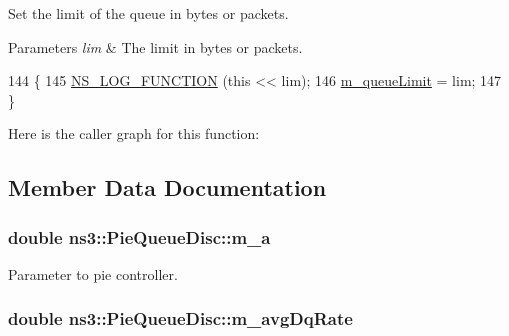 Set the limit of the queue in bytes or packets. 


\begin{DoxyParams}{Parameters}
{\em lim} & The limit in bytes or packets. \\
\hline
\end{DoxyParams}

\begin{DoxyCode}
144 \{
145   \hyperlink{log-macros-disabled_8h_a90b90d5bad1f39cb1b64923ea94c0761}{NS\_LOG\_FUNCTION} (\textcolor{keyword}{this} << lim);
146   \hyperlink{classns3_1_1PieQueueDisc_ad5a24ff6288913559429261d124db5eb}{m\_queueLimit} = lim;
147 \}
\end{DoxyCode}


Here is the caller graph for this function\+:




\subsection{Member Data Documentation}
\subsubsection[{\texorpdfstring{m\+\_\+a}{m_a}}]{\setlength{\rightskip}{0pt plus 5cm}double ns3\+::\+Pie\+Queue\+Disc\+::m\+\_\+a\hspace{0.3cm}{\ttfamily [private]}}\hypertarget{classns3_1_1PieQueueDisc_aa7302b5d199b328f69ddfdb00858ff98}{}\label{classns3_1_1PieQueueDisc_aa7302b5d199b328f69ddfdb00858ff98}


Parameter to pie controller. 

\subsubsection[{\texorpdfstring{m\+\_\+avg\+Dq\+Rate}{m_avgDqRate}}]{\setlength{\rightskip}{0pt plus 5cm}double ns3\+::\+Pie\+Queue\+Disc\+::m\+\_\+avg\+Dq\+Rate\hspace{0.3cm}{\ttfamily [private]}}\hypertarget{classns3_1_1PieQueueDisc_a83830fdf72e0b5e7809e403fcba45ffa}{}\label{classns3_1_1PieQueueDisc_a83830fdf72e0b5e7809e403fcba45ffa}


